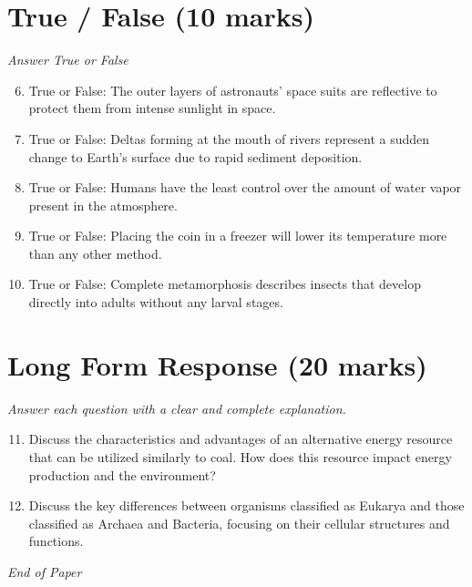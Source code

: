 \documentclass[12pt]{article}
\begin{document}
\section*{True / False (10 marks)}
\textit{Answer True or False}
\begin{enumerate}[label=\arabic*.]
\setcounter{enumi}{5}
\item True or False: The outer layers of astronauts' space suits are reflective to protect them from intense sunlight in space.
\item True or False: Deltas forming at the mouth of rivers represent a sudden change to Earth's surface due to rapid sediment deposition.
\item True or False: Humans have the least control over the amount of water vapor present in the atmosphere.
\item True or False: Placing the coin in a freezer will lower its temperature more than any other method.
\item True or False: Complete metamorphosis describes insects that develop directly into adults without any larval stages.
\end{enumerate}

\section*{Long Form Response (20 marks)}
\textit{Answer each question with a clear and complete explanation.}
\begin{enumerate}[label=\arabic*.]
\setcounter{enumi}{10}
\item Discuss the characteristics and advantages of an alternative energy resource that can be utilized similarly to coal. How does this resource impact energy production and the environment?
\item Discuss the key differences between organisms classified as Eukarya and those classified as Archaea and Bacteria, focusing on their cellular structures and functions.
\end{enumerate}

\vfill
\noindent\textit{End of Paper}
\end{document}
